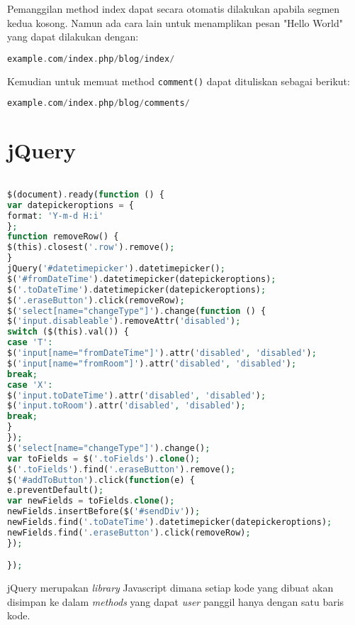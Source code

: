 \noindent Pemanggilan method index dapat secara otomatis dilakukan apabila segmen kedua kosong. Namun ada cara lain untuk menamplikan pesan "Hello World" yang dapat dilakukan dengan:

\begin{lstlisting}[frame=single, language=PHP, label={lst:methodCI}, caption=Method pada codeIgniter.] 
example.com/index.php/blog/index/
\end{lstlisting}

\noindent Kemudian untuk memuat method \texttt{comment()} dapat dituliskan sebagai berikut:
\begin{lstlisting}[frame=single, language=PHP, label={lst:loadMethodCI}, caption=Load method pada codeIgniter.] 
example.com/index.php/blog/comments/
\end{lstlisting}

\section{jQuery}

\begin{lstlisting}[frame=single, language=PHP, label={lst:jQuery}, caption=Load method pada codeIgniter.] 

$(document).ready(function () {
var datepickeroptions = {
format: 'Y-m-d H:i'
};
function removeRow() {
$(this).closest('.row').remove();
}
jQuery('#datetimepicker').datetimepicker();
$('#fromDateTime').datetimepicker(datepickeroptions);
$('.toDateTime').datetimepicker(datepickeroptions);
$('.eraseButton').click(removeRow);
$('select[name="changeType"]').change(function () {
$('input.disableable').removeAttr('disabled');
switch ($(this).val()) {
case 'T':
$('input[name="fromDateTime"]').attr('disabled', 'disabled');
$('input[name="fromRoom"]').attr('disabled', 'disabled');
break;
case 'X':
$('input.toDateTime').attr('disabled', 'disabled');
$('input.toRoom').attr('disabled', 'disabled');
break;
}
});
$('select[name="changeType"]').change();
var toFields = $('.toFields').clone();
$('.toFields').find('.eraseButton').remove();
$('#addToButton').click(function(e) {
e.preventDefault();
var newFields = toFields.clone();
newFields.insertBefore($('#sendDiv'));
newFields.find('.toDateTime').datetimepicker(datepickeroptions);
newFields.find('.eraseButton').click(removeRow);
});

});
\end{lstlisting}


jQuery merupakan \textit{library} Javascript dimana setiap kode yang dibuat akan disimpan ke dalam \textit{methods} yang dapat \textit{user} panggil hanya dengan satu baris kode.

